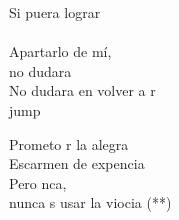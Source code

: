 \begin{cancion}
	Si puera lograr\\
	\jump\\
Apartarlo de mí, \\
	no dudara\\
	No dudara en volver a r \\jump\\
	\begin{chorus}%
	Prometo r la alegra\\
	Escarmen de  expencia\\
	Pero nca,\\
	nunca s usar la viocia (**) \\
	\end{chorus}%
	\jump\\
\end{cancion}%
